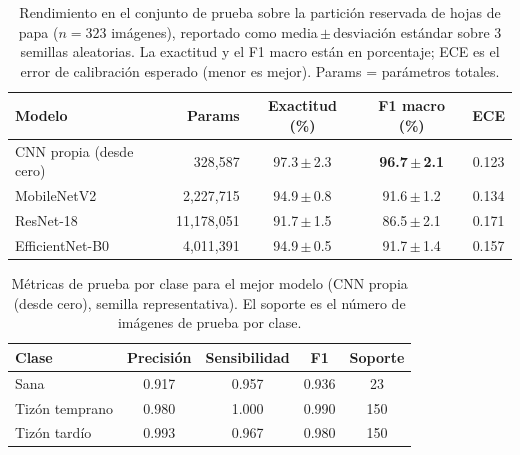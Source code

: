 \begin{table}[t]
\centering
\caption{Rendimiento en el conjunto de prueba sobre la partición reservada de hojas de papa ($n=323$ imágenes), reportado como media\,$\pm$\,desviación estándar sobre 3 semillas aleatorias. La exactitud y el F1 macro están en porcentaje; ECE es el error de calibración esperado (menor es mejor). Params = parámetros totales.}
\label{tab:results}
\begin{tabular}{lrccc}
\hline
Modelo & Params & Exactitud (\%) & F1 macro (\%) & ECE \\
\hline
CNN propia (desde cero) & 328{,}587 & 97.3\,$\pm$\,2.3 & \textbf{96.7\,$\pm$\,2.1} & 0.123 \\
MobileNetV2 & 2{,}227{,}715 & 94.9\,$\pm$\,0.8 & {91.6\,$\pm$\,1.2} & 0.134 \\
ResNet-18 & 11{,}178{,}051 & 91.7\,$\pm$\,1.5 & {86.5\,$\pm$\,2.1} & 0.171 \\
EfficientNet-B0 & 4{,}011{,}391 & 94.9\,$\pm$\,0.5 & {91.7\,$\pm$\,1.4} & 0.157 \\
\hline
\end{tabular}
\end{table}

\begin{table}[t]
\centering
\caption{Métricas de prueba por clase para el mejor modelo (CNN propia (desde cero), semilla representativa). El soporte es el número de imágenes de prueba por clase.}
\label{tab:perclass}
\begin{tabular}{lcccc}
\hline
Clase & Precisión & Sensibilidad & F1 & Soporte \\
\hline
Sana & 0.917 & 0.957 & 0.936 & 23 \\
Tizón temprano & 0.980 & 1.000 & 0.990 & 150 \\
Tizón tardío & 0.993 & 0.967 & 0.980 & 150 \\
\hline
\end{tabular}
\end{table}
